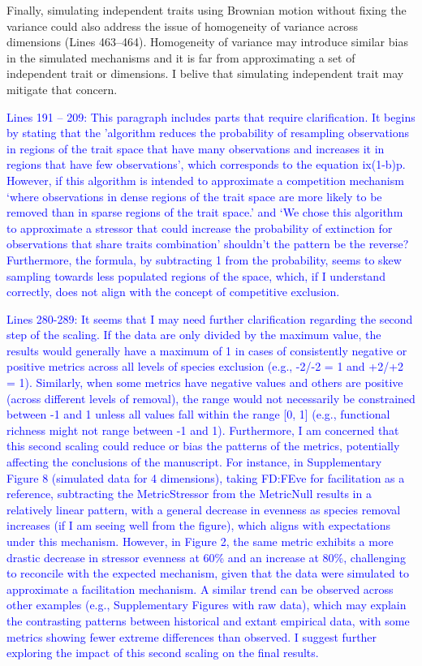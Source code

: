 \documentclass[
]{article}
\begin{document}
{Finally, simulating independent traits using Brownian motion without fixing the variance could also address the issue of homogeneity of variance across dimensions (Lines 463–464). Homogeneity of variance may introduce similar bias in the simulated mechanisms and it is far from approximating a set of independent trait or dimensions. I belive that simulating independent trait may mitigate that concern.}

\textcolor{blue}{Lines 191 – 209: This paragraph includes parts that require clarification. It begins by stating that the 'algorithm reduces the probability of resampling observations in regions of the trait space that have many observations and increases it in regions that have few observations', which corresponds to the equation ix(1-b)p.  However, if this algorithm is intended to approximate a competition mechanism ‘where observations in dense regions of the trait space are more likely to be removed than in sparse regions of the trait space.’ and ‘We chose this algorithm to approximate a stressor that could increase the probability of extinction for observations that share traits combination’ shouldn’t the pattern be the reverse? Furthermore, the formula, by subtracting 1 from the probability, seems to skew sampling towards less populated regions of the space, which, if I understand correctly, does not align with the concept of competitive exclusion.}

\textcolor{blue}{Lines 280-289: It seems that I may need further clarification regarding the second step of the scaling. If the data are only divided by the maximum value, the results would generally have a maximum of 1 in cases of consistently negative or positive metrics across all levels of species exclusion (e.g., -2/-2 = 1 and +2/+2 = 1). Similarly, when some metrics have negative values and others are positive (across different levels of removal), the range would not necessarily be constrained between -1 and 1 unless all values fall within the range [0, 1] (e.g., functional richness might not range between -1 and 1). Furthermore, I am concerned that this second scaling could reduce or bias the patterns of the metrics, potentially affecting the conclusions of the manuscript. For instance, in Supplementary Figure 8 (simulated data for 4 dimensions), taking FD:FEve for facilitation as a reference, subtracting the MetricStressor from the MetricNull results in a relatively linear pattern, with a general decrease in evenness as species removal increases (if I am seeing well from the figure), which aligns with expectations under this mechanism. However, in Figure 2, the same metric exhibits a more drastic decrease in stressor evenness at 60\% and an increase at 80\%, challenging to reconcile with the expected mechanism, given that the data were simulated to approximate a facilitation mechanism. A similar trend can be observed across other examples (e.g., Supplementary Figures with raw data), which may explain the contrasting patterns between historical and extant empirical data, with some metrics showing fewer extreme differences than observed. I suggest further exploring the impact of this second scaling on the final results.}
\end{document}
